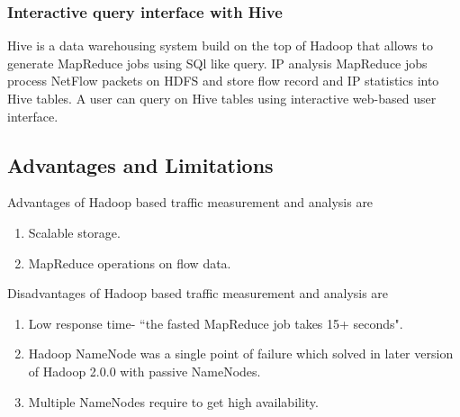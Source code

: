       \subsubsection{Interactive query interface with Hive}
      Hive is a data warehousing system build on the top of Hadoop that allows to generate MapReduce jobs using SQl like query.
      IP analysis MapReduce jobs process NetFlow packets on HDFS and  store flow record and IP statistics into
      Hive tables. A user can query on Hive tables using interactive web-based user interface.
      
      \subsection{Advantages and Limitations}
      Advantages of Hadoop based traffic  measurement and analysis are 
	\begin{enumerate}
	  \item Scalable storage.
	  \item MapReduce operations on flow data.
	\end{enumerate}
      Disadvantages of Hadoop based traffic  measurement and analysis are
	\begin{enumerate}
	 \item Low response time- ``the fasted MapReduce job takes 15+ seconds"\cite{mapreducetime}.
	 \item Hadoop NameNode was a single point of failure which solved in later version of 
	        Hadoop 2.0.0 with passive NameNodes.
	 \item Multiple NameNodes require to get high availability\cite{ha}.
	\end{enumerate}

